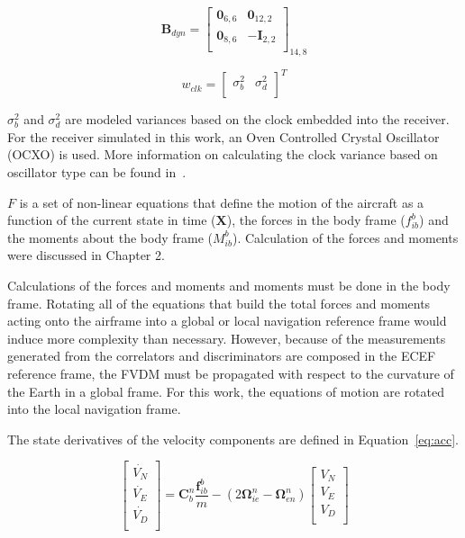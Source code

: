 \begin{equation}\label{eq:Bclk}
    \mathbf{B}_{dyn} =\begin{bmatrix}
        \mathbf{0}_{6,6} & \mathbf{0}_{12,2} \\
        \mathbf{0}_{8,6} & -\mathbf{I}_{2,2} \\
    \end{bmatrix}_{14,8}
\end{equation}

\begin{equation}\label{eq:wClk}
    w_{clk} = \begin{bmatrix}
        \sigma^2_b & \sigma^2_d \\
    \end{bmatrix}^T
\end{equation}

\(\sigma^2_b\) and \(\sigma^2_d\) are modeled variances based on the clock embedded into the receiver. For the receiver simulated in this work, an Oven Controlled Crystal Oscillator (OCXO) is used. More information on calculating the clock variance based on oscillator type can be found in~\cite{robertgroverbrownIntroductionRandomSignals2013}.

\(F\) is a set of non-linear equations that define the motion of the aircraft as a function of the current state in time (\(\mathbf{X}\)), the forces in the body frame (\(f_{ib}^b\)) and the moments about the body frame (\(M_{ib}^b\)). Calculation of the forces and moments were discussed in Chapter 2.

Calculations of the forces and moments and moments must be done in the body frame. Rotating all of the equations that build the total forces and moments acting onto the airframe into a global or local navigation reference frame would induce more complexity than necessary. However, because of the measurements generated from the correlators and discriminators are composed in the ECEF reference frame, the FVDM must be propagated with respect to the curvature of the Earth in a global frame. For this work, the equations of motion are rotated into the local navigation frame.

The state derivatives of the velocity components are defined in Equation~\ref{eq:acc}.

\begin{equation}\label{eq:acc}
    \begin{bmatrix}
        \dot{V_N} \\
        \dot{V_E} \\
        \dot{V_D} \\
    \end{bmatrix} =
    \mathbf{C}_{b}^{n}\frac{\mathbf{f}_{ib}^b}{m} - \left(2\mathbf{\Omega}_{ie}^n - \mathbf{\Omega}_{en}^n\right)
    \begin{bmatrix}
        V_N \\
        V_E \\
        V_D \\
    \end{bmatrix}
\end{equation}

